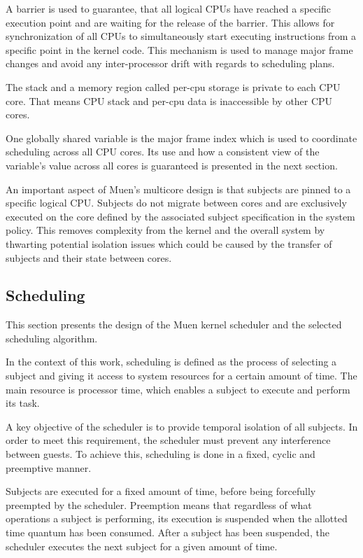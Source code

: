 A barrier is used to guarantee, that all logical CPUs have
reached a specific execution point and are waiting for the release of the
barrier. This allows for synchronization of all CPUs to simultaneously start
executing instructions from a specific point in the kernel code. This mechanism
is used to manage major frame changes and avoid any inter-processor drift with
regards to scheduling plans.

The stack and a memory region called per-cpu storage is private to each CPU
core. That means CPU stack and per-cpu data is inaccessible by other CPU cores.

One globally shared variable is the major frame index which is used to
coordinate scheduling across all CPU cores. Its use and how a consistent view of
the variable's value across all cores is guaranteed is presented in the next
section.

An important aspect of Muen's multicore design is that subjects are pinned to a
specific logical CPU. Subjects do not migrate between cores and are exclusively
executed on the core defined by the associated subject specification in the
system policy. This removes complexity from the kernel and the overall system by
thwarting potential isolation issues which could be caused by the transfer of
subjects and their state between cores.

\subsection{Scheduling}\label{subsec:design-scheduling}
This section presents the design of the Muen kernel scheduler
and the selected scheduling algorithm.

In the context of this work, scheduling is defined as the process of selecting
a subject and giving it access to system resources for a certain amount of time.
The main resource is processor time, which enables a subject to execute and
perform its task.

A key objective of the scheduler is to provide temporal
isolation of all subjects. In order to meet this
requirement, the scheduler must prevent any interference between guests. To
achieve this, scheduling is done in a fixed, cyclic and preemptive manner.

Subjects are executed for a fixed amount of time, before being forcefully
preempted by the scheduler. Preemption means that regardless of what operations
a subject is performing, its execution is suspended when the allotted time
quantum has been consumed. After a subject has been suspended, the scheduler
executes the next subject for a given amount of time.

